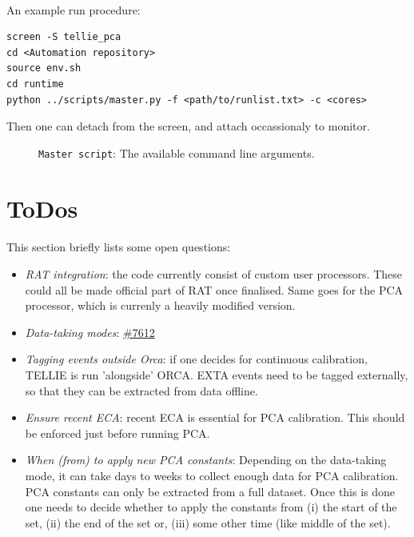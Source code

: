 \documentclass[12pt]{article}
\begin{document}
\paragraph{}
An example run procedure:
\begin{lstlisting}
screen -S tellie_pca
cd <Automation repository>
source env.sh
cd runtime
python ../scripts/master.py -f <path/to/runlist.txt> -c <cores>
\end{lstlisting}
Then one can detach from the screen, and attach occassionaly to monitor.

\begin{figure}
\centering
\noindent{}
  \caption{\centering \texttt{Master script}: The available command line arguments.}
  \label{fig:args}
\end{figure}

\clearpage

\section{ToDos}
\paragraph{}
This section briefly lists some open questions:
\begin{itemize}
	\item \textit{RAT integration}: the code currently consist of custom user processors. These could all be made official part of RAT once finalised. Same goes for the PCA processor, which is currenly a heavily modified version.
	\item \textit{Data-taking modes}: \href{https://www.snolab.ca/snoplus/private/DocDB/cgi/ShowDocument?docid=7612}{\#7612}
	\item \textit{Tagging events outside Orca}: if one decides for continuous calibration, TELLIE is run 'alongside' ORCA. EXTA events need to be tagged externally, so that they can be extracted from data offline.
	\item \textit{Ensure recent ECA}: recent ECA is essential for PCA calibration. This should be enforced just before running PCA.
	\item \textit{When (from) to apply new PCA constants}: Depending on the data-taking mode, it can take days to weeks to collect enough data for PCA calibration. PCA constants can only be extracted from a full dataset. Once this is done one needs to decide whether to apply the constants from (i) the start of the set, (ii) the end of the set or, (iii) some other time (like middle of the set).
\end{itemize}
\end{document}

